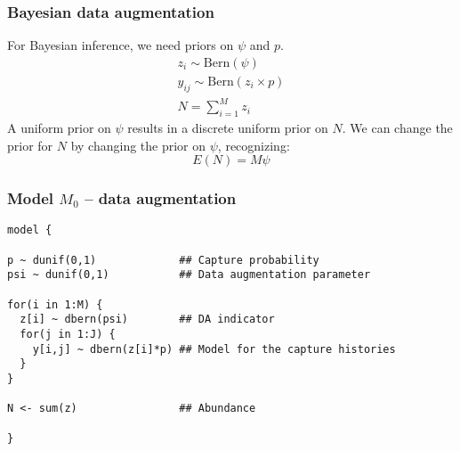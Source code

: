 \documentclass[color=usenames,dvipsnames]{beamer}\usepackage[]{graphicx}\usepackage[]{xcolor}
\makeatletter
\newenvironment{kframe}{%
 \def\at@end@of@kframe{}%
 \ifinner\ifhmode%
  \def\at@end@of@kframe{\end{minipage}}%
  \begin{minipage}{\columnwidth}%
 \fi\fi%
 \def\FrameCommand##1{\hskip\@totalleftmargin \hskip-\fboxsep
 \colorbox{shadecolor}{##1}\hskip-\fboxsep
     \hskip-\linewidth \hskip-\@totalleftmargin \hskip\columnwidth}%
 \MakeFramed {\advance\hsize-\width
   \@totalleftmargin\z@ \linewidth\hsize
   \@setminipage}}%
 {\par\unskip\endMakeFramed%
 \at@end@of@kframe}
\newenvironment{knitrout}{}{} %
\makeatother
\begin{document}






\begin{frame}
  \frametitle{Bayesian data augmentation}
  For Bayesian inference, we need priors on $\psi$ and $p$. 
  \begin{gather*}
    z_i \sim \mathrm{Bern}(\psi) \\
    y_{ij} \sim \mathrm{Bern}(z_i \times p) \\
    N = \sum_{i=1}^M z_i
  \end{gather*}
  \vfill
  A uniform prior on $\psi$ results in a discrete uniform prior on
  $N$. We can change the prior for $N$ by changing the prior on  
  $\psi$, recognizing:
  \[
    E(N)=M\psi
  \]
\end{frame}



\begin{frame}[fragile]
  \frametitle{Model $M_0$ -- data augmentation}
\vspace{-3pt}
\begin{knitrout}\footnotesize
{}\color{fgcolor}\begin{kframe}
\begin{verbatim}
model {

p ~ dunif(0,1)             ## Capture probability
psi ~ dunif(0,1)           ## Data augmentation parameter

for(i in 1:M) {
  z[i] ~ dbern(psi)        ## DA indicator
  for(j in 1:J) {
    y[i,j] ~ dbern(z[i]*p) ## Model for the capture histories
  }
}

N <- sum(z)                ## Abundance

}
\end{verbatim}
\end{kframe}
\end{knitrout}
\end{frame}
\end{document}

